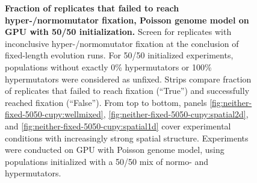 \begin{figure}[h]
  \begin{minipage}{\textwidth}
    \caption{%
      \textbf{Fraction of replicates that failed to reach hyper-/normomutator fixation, Poisson genome model on GPU with 50/50 initialization.}
      \footnotesize
      Screen for replicates with inconclusive hyper-/normomutator fixation at the conclusion of fixed-length evolution runs.
      For 50/50 initialized experiments, populations without exactly 0\% hypermutators or 100\% hypermutators were considered as unfixed.
      Strips compare fraction of replicates that failed to reach fixation (``True'') and successfully reached fixation (``False'').
      From top to bottom, panels \ref{fig:neither-fixed-5050-cupy:wellmixed}, \ref{fig:neither-fixed-5050-cupy:spatial2d}, and \ref{fig:neither-fixed-5050-cupy:spatial1d} cover experimental conditions with increasingly strong spatial structure.
      Experiments were conducted on GPU with Poisson genome model, using populations initialized with a 50/50 mix of normo- and hypermutators.
}
    \label{fig:neither-fixed-5050-cupy}
  \end{minipage}
\end{figure}
